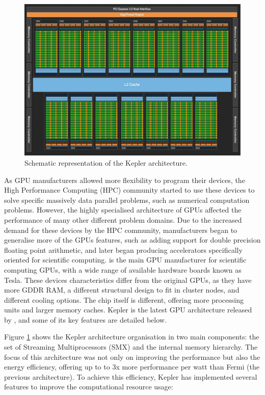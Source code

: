 \begin{figure}[!htp]
	\begin{center}
		\includegraphics[scale=0.45]{imgs/kepler_arch.png}
		\caption{Schematic representation of the \nvidia Kepler architecture.}
		\label{fig:kepler}
	\end{center}
\end{figure}

As GPU manufacturers allowed more flexibility to program their devices, the High Performance Computing (HPC) community started to use these devices to solve specific massively data parallel problems, such as numerical computation problems. However, the highly specialised architecture of GPUs affected the performance of many other different problem domains. Due to the increased demand for these devices by the HPC community, manufacturers began to generalise more of the GPUs features, such as adding support for double precision floating point arithmetic, and later began producing accelerators specifically oriented for scientific computing. \nvidia is the main GPU manufacturer for scientific computing GPUs, with a wide range of available hardware boards known as Tesla. These devices characteristics differ from the original GPUs, as they have more GDDR RAM, a different structural design to fit in cluster nodes, and different cooling options. The chip itself is different, offering more processing units and larger memory caches. Kepler \cite{NVIDIA:Kepler} is the latest GPU architecture released by \nvidia, and some of its key features are detailed below.

Figure \ref{fig:kepler} shows the Kepler architecture organisation in two main components: the set of Streaming Multiprocessors (SMX) and the internal memory hierarchy. The focus of this architecture was not only on improving the performance but also the energy efficiency, offering up to to 3x more performance per watt than Fermi (the previous architecture). To achieve this efficiency, Kepler has implemented several features to improve the computational resource usage:

